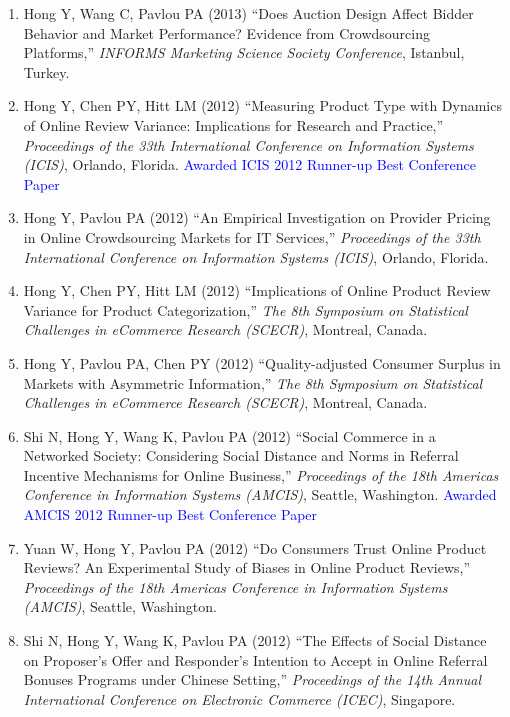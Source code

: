 \documentclass[paper=letter,fontsize=10pt]{scrartcl} %
\newcommand{\ConfEntry}[6]{
		\noindent #1 (#2) ``#3,'' \textit{#4}, #5. \textcolor{blue}{#6}}
\newcommand{\Hong}{Hong Y}
\begin{document}
\begin{enumerate}
\item \ConfEntry{\Hong, Wang C, Pavlou PA}{2013}{Does Auction Design Affect Bidder Behavior and Market Performance? Evidence from Crowdsourcing Platforms}{INFORMS Marketing Science Society Conference}{Istanbul, Turkey}{}

\item \ConfEntry{\Hong, Chen PY, Hitt LM}{2012}{Measuring Product Type with Dynamics of Online Review Variance: Implications for Research and Practice}{Proceedings of the 33th International Conference on Information Systems (ICIS)}{Orlando, Florida}{\protect\newline Awarded ICIS 2012 Runner-up Best Conference Paper}

\item \ConfEntry{\Hong, Pavlou PA}{2012}{An Empirical Investigation on Provider Pricing in Online Crowdsourcing Markets for IT Services}{Proceedings of the 33th International Conference on Information Systems (ICIS)}{Orlando, Florida}{}

\item \ConfEntry{\Hong, Chen PY, Hitt LM}{2012}{Implications of Online Product Review Variance for Product Categorization}{The 8th Symposium on Statistical Challenges in eCommerce Research (SCECR)}{Montreal, Canada}{}

\item \ConfEntry{\Hong, Pavlou PA, Chen PY}{2012}{Quality-adjusted Consumer Surplus in Markets with Asymmetric Information}{The 8th Symposium on Statistical Challenges in eCommerce Research (SCECR)}{Montreal, Canada}{}

\item \ConfEntry{Shi N, \Hong, Wang K, Pavlou PA}{2012}{Social Commerce in a Networked Society: Considering Social Distance and Norms in Referral Incentive Mechanisms for Online Business}{Proceedings of the 18th Americas Conference in Information Systems (AMCIS)}{Seattle, Washington}{\protect\newline Awarded AMCIS 2012 Runner-up Best Conference Paper}

\item \ConfEntry{Yuan W, \Hong, Pavlou PA}{2012}{Do Consumers Trust Online Product Reviews? An Experimental Study of Biases in Online Product Reviews}{Proceedings of the 18th Americas Conference in Information Systems (AMCIS)}{Seattle, Washington}{}

\item \ConfEntry{Shi N, \Hong, Wang K, Pavlou PA}{2012}{The Effects of Social Distance on Proposer's Offer and Responder's Intention to Accept in Online Referral Bonuses Programs under Chinese Setting}{Proceedings of the 14th Annual International Conference on Electronic Commerce (ICEC)}{Singapore}{}


\end{enumerate}
\end{document}
